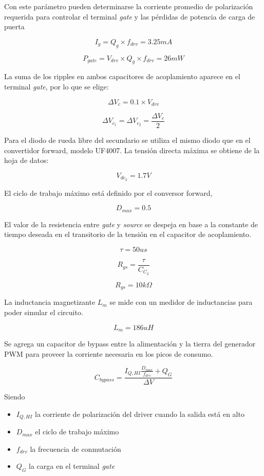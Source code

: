Con este parámetro pueden determinarse la corriente promedio de polarización requerida para controlar el terminal \textit{gate} 
y las pérdidas de potencia de carga de puerta

$$ I_g=Q_g\times f_{drv}=3.25mA $$

$$ P_{gate}=V_{drv}\times Q_g\times f_{drv}=26mW $$


La suma de los ripples en ambos capacitores de acoplamiento aparece en el terminal \textit{gate},
por lo que se elige:

$$ \Delta V_c=0.1\times V_{drv} $$

$$ \Delta V_{c_1}=\Delta V_{c_2}=\frac{\Delta V_c}{2} $$

Para el diodo de rueda libre del secundario se utiliza el mismo diodo que en el convertidor forward, modelo UF4007. 
La tensión directa máxima se obtiene de la hoja de datos: 

$$ V_{dc_2}=1.7V $$

El ciclo de trabajo máximo está definido por el conversor forward, 

$$ D_{max}=0.5 $$

El valor de la resistencia entre \textit{gate} y \textit{source} se despeja en base a la constante de tiempo deseada en el transitorio de la tensión en el capacitor de acoplamiento.

$$ \tau=50us $$


$$ R_{gs}=\frac{\tau}{C_{C_2}} $$

$$ R_{gs}=10k\Omega $$

La inductancia magnetizante $L_m$ se mide con un medidor de inductancias para poder simular el circuito.

$$ L_m=186uH $$



Se agrega un capacitor de bypass entre la alimentación y la tierra del generador PWM para proveer la corriente necesaria en los picos de consumo.


$$ C_{bypass}=\frac{I_{Q,HI}\frac{D_{max}}{f_{drv}}+Q_G}{\Delta V} $$

Siendo

\begin{itemize}
    \item $I_{Q,HI}$ la corriente de polarización del driver cuando la salida está en alto
    \item $D_{max}$ el ciclo de trabajo máximo
    \item $f_{drv}$ la frecuencia de conmutación
    \item $Q_G$ la carga en el terminal \textit{gate}
\end{itemize}

